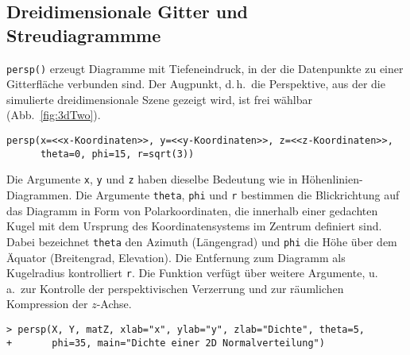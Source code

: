 \subsection{Dreidimensionale Gitter und Streudiagrammme}
\label{sec:3dGrid}

\lstinline!persp()! erzeugt Diagramme mit Tiefeneindruck, in der die Datenpunkte zu einer Gitterfläche verbunden sind. Der Augpunkt, d.\,h.\ die Perspektive, aus der die simulierte dreidimensionale Szene gezeigt wird, ist frei wählbar (Abb.\ \ref{fig:3dTwo}).
\begin{lstlisting}
persp(x=<<x-Koordinaten>>, y=<<y-Koordinaten>>, z=<<z-Koordinaten>>,
      theta=0, phi=15, r=sqrt(3))
\end{lstlisting}

Die Argumente \lstinline!x!, \lstinline!y! und \lstinline!z! haben dieselbe Bedeutung wie in Höhenlinien-Diagrammen. Die Argumente \lstinline!theta!, \lstinline!phi! und \lstinline!r! bestimmen die Blickrichtung auf das Diagramm in Form von Polarkoordinaten, die innerhalb einer gedachten Kugel mit dem Ursprung des Koordinatensystems im Zentrum definiert sind. Dabei bezeichnet \lstinline!theta! den Azimuth (Längengrad) und \lstinline!phi! die Höhe über dem Äquator (Breitengrad, Elevation). Die Entfernung zum Diagramm als Kugelradius kontrolliert \lstinline!r!. Die Funktion verfügt über weitere Argumente, u.\,a.\ zur Kontrolle der perspektivischen Verzerrung und zur räumlichen Kompression der $z$-Achse.
\begin{lstlisting}
> persp(X, Y, matZ, xlab="x", ylab="y", zlab="Dichte", theta=5,
+       phi=35, main="Dichte einer 2D Normalverteilung")
\end{lstlisting}

